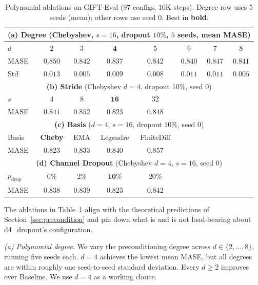 \documentclass[11pt]{article}
\theoremstyle{plain}
\theoremstyle{definition}
\theoremstyle{remark}
\newcommand{\HD}{\textsf{d4\_dropout}}
\newcommand{\Baseline}{\textsf{Baseline}}
\begin{document}
\begin{table}[h]
\centering
\small
\caption{Polynomial ablations on GIFT-Eval (97 configs, $10$K steps). Degree row uses 5 seeds (mean); other rows use seed 0. Best in \textbf{bold}.}
\label{tab:ablations-main}
\begin{tabular}{lccccccc}
\toprule
\multicolumn{8}{c}{\textbf{(a) Degree} (Chebyshev, $s=16$, dropout $10\%$, $5$ seeds, mean MASE)} \\
\midrule
$d$ & $2$ & $3$ & $\mathbf{4}$ & $5$ & $6$ & $7$ & $8$ \\
MASE & $0.850$ & $0.842$ & $\mathbf{0.837}$ & $0.842$ & $0.840$ & $0.847$ & $0.841$ \\
Std & $0.013$ & $0.005$ & $0.009$ & $0.008$ & $0.011$ & $0.011$ & $0.005$ \\
\midrule
\multicolumn{8}{c}{\textbf{(b) Stride} (Chebyshev $d{=}4$, dropout $10\%$, seed 0)} \\
\midrule
$s$ & $4$ & $8$ & $\mathbf{16}$ & $32$ & & & \\
MASE & $0.841$ & $0.852$ & $\mathbf{0.823}$ & $0.848$ & & & \\
\midrule
\multicolumn{8}{c}{\textbf{(c) Basis} ($d{=}4$, $s{=}16$, dropout $10\%$, seed 0)} \\
\midrule
Basis & \textbf{Cheby} & EMA & Legendre & FiniteDiff & & & \\
MASE & $\mathbf{0.823}$ & $0.833$ & $0.840$ & $0.857$ & & & \\
\midrule
\multicolumn{8}{c}{\textbf{(d) Channel Dropout} (Chebyshev $d{=}4$, $s{=}16$, seed 0)} \\
\midrule
$p_{\text{drop}}$ & $0\%$ & $2\%$ & $\mathbf{10\%}$ & $20\%$ & & & \\
MASE & $0.838$ & $0.839$ & $\mathbf{0.823}$ & $0.842$ & & & \\
\bottomrule
\end{tabular}
\end{table}

The ablations in Table~\ref{tab:ablations-main} align with the theoretical predictions of Section~\ref{sec:precondition} and pin down what is and is not load-bearing about \HD{}'s configuration.

\emph{(a) Polynomial degree.} We vary the preconditioning degree across $d \in \{2, \ldots, 8\}$, running five seeds each. $d = 4$ achieves the lowest mean MASE, but all degrees are within roughly one seed-to-seed standard deviation. Every $d \geq 2$ improves over \Baseline{}. We use $d = 4$ as a working choice.
\end{document}
